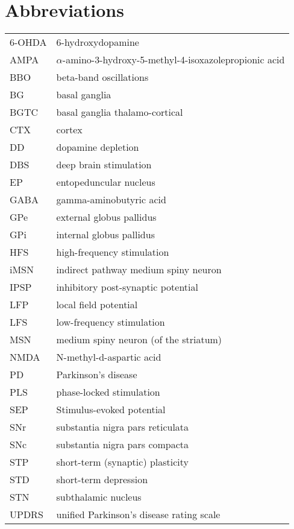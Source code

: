 \section*{Abbreviations} %

\begin{tabular}{ll}
6-OHDA  & 6-hydroxydopamine \\
AMPA    & $\alpha$-amino-3-hydroxy-5-methyl-4-isoxazolepropionic acid \\
BBO     & beta-band oscillations \\
BG      & basal ganglia \\
BGTC    & basal ganglia thalamo-cortical \\
CTX     & cortex \\
DD      & dopamine depletion \\
DBS     & deep brain stimulation \\
EP      & entopeduncular nucleus \\
GABA    & gamma-aminobutyric acid \\
GPe     & external globus pallidus \\
GPi     & internal globus pallidus \\
HFS     & high-frequency stimulation \\
iMSN    & indirect pathway medium spiny neuron \\
IPSP    & inhibitory post-synaptic potential \\
LFP     & local field potential \\
LFS     & low-frequency stimulation \\
MSN     & medium spiny neuron (of the striatum) \\
NMDA    & N-methyl-d-aspartic acid \\
PD      & Parkinson's disease \\
PLS     & phase-locked stimulation \\
SEP     & Stimulus-evoked potential \\
SNr     & substantia nigra pars reticulata \\
SNc     & substantia nigra pars compacta \\
STP     & short-term (synaptic) plasticity \\
STD     & short-term depression \\
STN     & subthalamic nucleus \\
UPDRS   & unified Parkinson's disease rating scale
\end{tabular}